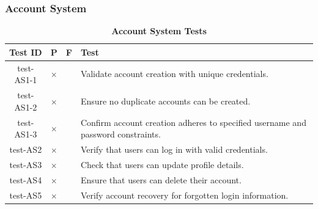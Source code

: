 \documentclass[12pt, titlepage]{article}
\begin{document}


					
					
					



					
					
					




\subsubsection{Account System}

\begin{table}[H]
\centering
\begin{tabular}{|c|c|c|p{6cm}|}
\hline
Test ID & P & F & Test\\
\hline 
test-AS1-1 & $\times$ & & Validate account creation with unique credentials.\\
\hline 
test-AS1-2 & $\times$ & & Ensure no duplicate accounts can be created.\\
\hline 
test-AS1-3 & $\times$ & & Confirm account creation adheres to specified username and password constraints.\\
\hline 
test-AS2 & $\times$ & & Verify that users can log in with valid credentials.\\
\hline 
test-AS3 & $\times$ & & Check that users can update profile details.\\
\hline 
test-AS4 & $\times$ & & Ensure that users can delete their account.\\
\hline 
test-AS5 & $\times$ & & Verify account recovery for forgotten login information.\\
\hline
\end{tabular}
\caption{\bf Account System Tests}
\end{table}
\end{document}
